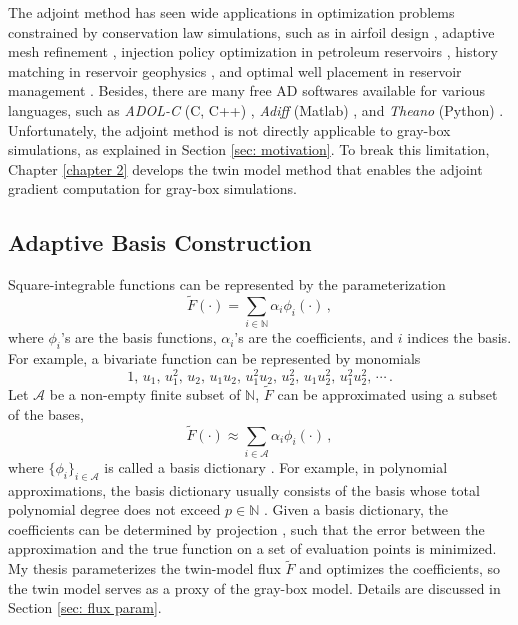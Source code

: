The adjoint method has seen wide applications in optimization problems constrained by 
conservation law simulations, such as in
airfoil design \cite{adjoint aerodynamics, adjoint aerodynamics 2, 
adjoint aerodynamics AD}, adaptive mesh refinement
\cite{discrete adjoint phd}, injection policy optimization in petroleum reservoirs
\cite{adjoint reservoir optimal control}, 
history matching in reservoir geophysics
\cite{review adjoint geo}, and optimal well placement in reservoir management 
\cite{adjoint well place}.
Besides, there are many free AD softwares available for various languages, such as
\emph{ADOL-C} (C, C++) \cite{adolc}, \emph{Adiff} (Matlab) \cite{adiff}, and \emph{Theano} (Python)
\cite{theano}.
Unfortunately, the adjoint method is not directly applicable
to gray-box simulations, as explained in Section \ref{sec: motivation}. 
To break this limitation, Chapter \ref{chapter 2} develops the twin model method
that enables the adjoint gradient computation for gray-box simulations.\\


\subsection{Adaptive Basis Construction}
\label{sec: adaptive basis review}
Square-integrable functions
can be represented by the parameterization 
\begin{equation}
    \tilde{F}(\cdot) = \sum_{i\in \mathbb{N}} {\alpha_i} \phi_i(\cdot)\,,
    \label{eqn: linear param general}
\end{equation}
where $\phi_i$'s are the basis functions, $\alpha_i$'s are the coefficients, and $i$
indices the basis. For example, 
a bivariate function can be represented by monomials
\begin{equation*}
    1,\,  u_1,\, u_1^2,\,
    u_2,\, u_1 u_2,\,  u_1^2 u_2, \,
    u_2^2,\,  u_1 u_2^2,\,  u_1^2 u_2^2,\, \cdots\,.
\end{equation*}
Let $\mathcal{A}$ be a non-empty finite subset of $\mathbb{N}$,
$\tilde{F}$ can be approximated using a subset of the bases, 
\begin{equation}
    \tilde{F}(\cdot) \approx \sum_{i\in \mathcal{A}} {\alpha_i} \phi_i(\cdot)\,,
    \label{eqn: linear param truncate}
\end{equation}
where $\{\phi_i\}_{i\in \mathcal{A}}$ is called a basis dictionary \cite{match pursuit}. 
For example, in polynomial approximations, the basis dictionary usually consists of
the basis whose total polynomial degree does not exceed $p\in \mathbb{N}$ \cite{PCE}.
Given a basis dictionary, the coefficients can be determined by projection \cite{PCE}, 
such that the error between the approximation
and the true function on a set of evaluation points 
is minimized. My thesis parameterizes the twin-model flux $\tilde{F}$ and
optimizes the coefficients,
so the twin model serves as a proxy of the gray-box model. Details are discussed in 
Section \ref{sec: flux param}.\\

